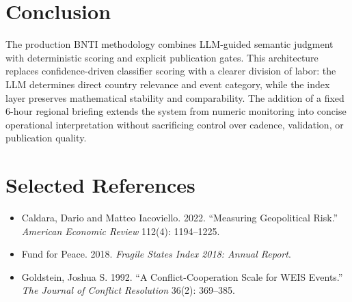 \documentclass[11pt, a4paper]{article}
\begin{document}
\section{Conclusion}
The production BNTI methodology combines LLM-guided semantic judgment with deterministic scoring and explicit publication gates. This architecture replaces confidence-driven classifier scoring with a clearer division of labor: the LLM determines direct country relevance and event category, while the index layer preserves mathematical stability and comparability. The addition of a fixed 6-hour regional briefing extends the system from numeric monitoring into concise operational interpretation without sacrificing control over cadence, validation, or publication quality.

\section*{Selected References}
\begin{itemize}
    \item Caldara, Dario and Matteo Iacoviello. 2022. ``Measuring Geopolitical Risk.'' \textit{American Economic Review} 112(4): 1194--1225.
    \item Fund for Peace. 2018. \textit{Fragile States Index 2018: Annual Report}.
    \item Goldstein, Joshua S. 1992. ``A Conflict-Cooperation Scale for WEIS Events.'' \textit{The Journal of Conflict Resolution} 36(2): 369--385.
\end{itemize}
\end{document}
